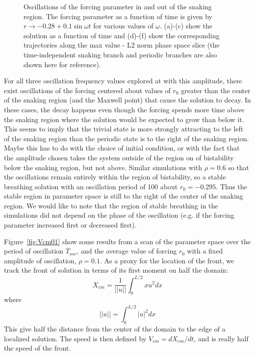 \documentclass[pre,preprint,superscriptaddress]{revtex4-1}
\begin{document}
\begin{figure}[!htb]
\begin{center}
{}
    \caption{Oscillations of the forcing parameter in and out of the snaking region.  The forcing parameter as a function of time is given by $r\rightarrow -0.28+ 0.1\sin\omega t$ for various values of $\omega$. (a)-(c) show the solution as a function of time and (d)-(f) show the corresponding trajectories along the max value - L2 norm phase space slice (the time-independent snaking branch and periodic branches are also shown here for reference). }
    \label{fig:OscOutSnake}
  \end{center}
\end{figure}

For all three oscillation frequency values explored at with this amplitude, there exist oscillations of the forcing centered about values of $r_0$ greater than the center of the snaking region (and the Maxwell point) that cause the solution to decay.  In these cases, the decay happens even though the forcing spends more time above the snaking region where the solution would be expected to grow than below it.  This seems to imply that the trivial state is more strongly attracting to the left of the snaking region than the periodic state is to the right of the snaking region.  Maybe this has to do with the choice of initial condition, or with the fact that the amplitude chosen takes the system outside of the region on of bistability below the snaking region, but not above.  Similar simulations with $\rho=0.6$ so that the oscillations remain entirely within the region of bistability, so a stable breathing solution with an oscillation period of 100 about $r_0=-0.295$.  Thus the stable region in parameter space is still to the right of the center of the snaking region.   We would like to note that the region of stable breathing in the simulations did not depend on the phase of the oscillation (e.g. if the forcing parameter increased first or decreased first). 

Figure~\ref{fig:Vcm01} show some results from a scan of the parameter space over the period of oscillation $T_{osc}$, and the average value of forcing $r_0$ with a fixed amplitude of oscillation, $\rho =0.1$.  As a proxy for the location of the front, we track the front of solution in terms of its first moment on half the domain:
\begin{equation}
X_{cm}=\frac{1}{||u||} \int_{0}^{L/2}  x u^2 dx
\end{equation}
where 
\begin{equation}
||u||= \int_{0}^{L/2}  |u|^2 dx
\end{equation}
This give half the distance from the center of the domain to the edge of a localized solution. The speed is then defined by $V_{cm} = d X_{cm}/dt$, and is really half the speed of the front.
\end{document}
